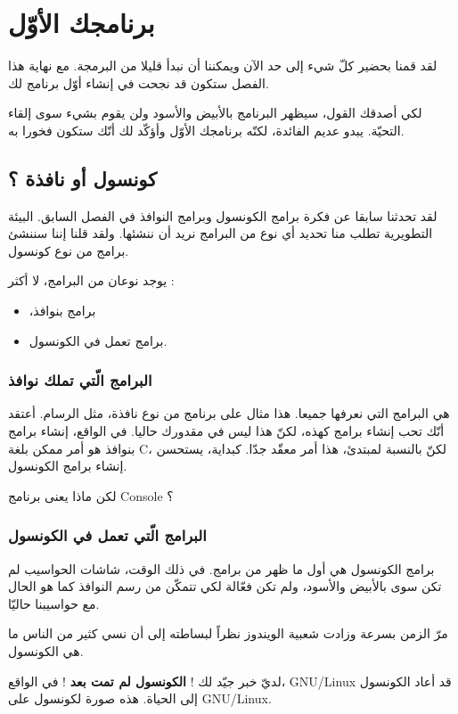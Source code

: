 \chapter{برنامجك الأوّل}
لقد قمنا بحضير كلّ شيء إلى حد الآن ويمكننا أن نبدأ قليلا من البرمجة. مع نهاية هذا الفصل ستكون قد نجحت في إنشاء أوّل برنامج لك.

لكي أصدقك القول، سيظهر البرنامج بالأبيض والأسود ولن يقوم بشيء سوى إلقاء التحيّة. يبدو عديم الفائدة، لكنّه برنامجك الأوّل وأؤكّد لك أنّك ستكون فخورا به.

\section{كونسول أو نافذة ؟}
لقد تحدثنا سابقا عن فكرة برامج الكونسول وبرامج النوافذ في الفصل السابق. البيئة التطويرية تطلب منا تحديد أي نوع من البرامج نريد أن ننشئها. ولقد قلنا إننا سننشئ برامج من نوع كونسول.

يوجد نوعان من البرامج، لا أكثر :
\begin{itemize}
  \item ،برامج بنوافذ
  \item برامج تعمل في الكونسول.
\end{itemize}

\subsection{البرامج الّتي تملك نوافذ}
هي البرامج التي نعرفها جميعا. هذا مثال على برنامج من نوع نافذة، مثل الرسام.
أعتقد أنّك تحب إنشاء برامج كهذه، لكنّ هذا ليس في مقدورك حاليا. في الواقع، إنشاء برامج بنوافذ هو أمر ممكن بلغة \textenglish{C}، لكنّ بالنسبة لمبتدئ، هذا أمر معقّد جدّا. كبداية، يستحسن إنشاء برامج الكونسول.

\begin{question}
  لكن ماذا يعنى برنامج
\textenglish{Console}
؟
\end{question}

\subsection{البرامج الّتي تعمل في الكونسول}
برامج الكونسول هي أول ما ظهر من برامج. في ذلك الوقت، شاشات الحواسيب لم تكن سوى بالأبيض والأسود، ولم تكن فعّالة لكي تتمكّن من رسم النوافذ كما هو الحال مع حواسيبنا حاليّا.

مرّ الزمن بسرعة وزادت شعبية الويندوز نظراً لبساطته إلى أن نسي كثير من الناس ما هي الكونسول.

لديّ خبر جيّد لك !
\textbf{الكونسول لم تمت بعد} !
 في الواقع،
\textenglish{GNU/Linux}
 قد أعاد الكونسول إلى الحياة. هذه صورة لكونسول على
\textenglish{GNU/Linux}.


